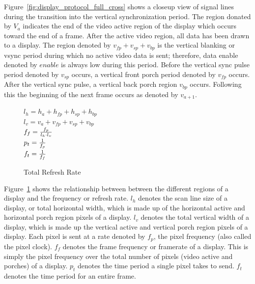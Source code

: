     Figure~\ref{fig:display_protocol_full_cross} shows a closeup view of signal lines during the transition into the vertical synchronization period. The region donated by $V_a$ indicates the end of the video active region of the display which occurs toward the end of a frame. After the active video region, all data has been drawn to a display. The region denoted by $v_{fp}+v_{sp}+v_{bp}$ is the vertical blanking or vsync period during which no active video data is sent; therefore, data enable denoted by $enable$ is always low during this period. Before the vertical sync pulse period denoted by $v_{sp}$ occurs, a vertical front porch period denoted by $v_{fp}$ occurs. After the vertical sync pulse, a vertical back porch region $v_{bp}$ occurs. Following this the beginning of the next frame occurs as denoted by $v_{a+1}$.
    \begin{figure}
        \centering
        { \Large
            $l_h=h_a+h_{fp}+h_{sp}+h_{bp}$ \vspace{8px} \\
            $l_v=v_a+v_{fp}+v_{sp}+v_{bp}$ \vspace{8px} \\
            $f_f={f_p \over {l_h \cdot l_v}}$ \\
            $p_t={1 \over f_p}$ \vspace{8px} \\
            $f_t={1 \over f_f}$ \vspace{8px}
        }
        \caption{Total Refresh Rate}
        \label{fig:modeline_refresh_rate}
    \end{figure}

    Figure~\ref{fig:modeline_refresh_rate} shows the relationship between between the different regions of a display and the frequency or refresh rate. $l_h$ denotes the scan line size of a display, or total horizontal width, which is made up of the horizontal active and horizontal porch region pixels of a display. $l_v$ denotes the total vertical width of a display, which is made up the vertical active and vertical porch region pixels of a display. Each pixel is sent at a rate denoted by $f_p$, the pixel frequency (also called the pixel clock). $f_f$ denotes the frame frequency or framerate of a display. This is simply the pixel frequency over the total number of pixels (video active and porches) of a display. $p_t$ denotes the time period a single pixel takes to send. $f_t$ denotes the time period for an entire frame.

